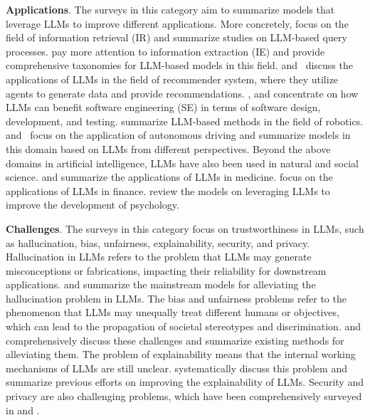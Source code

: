 \documentclass{article}
\theoremstyle{definition}
\theoremstyle{theorem}
\theoremstyle{proof}
\theoremstyle{remark}
\begin{document}
	\textbf{Applications}. The surveys in this category aim to summarize models that leverage LLMs to improve different applications. 
	More concretely, \citet{survey_llm_apply_info1} focus on the field of information retrieval (IR) and summarize studies on LLM-based query processes.
	\citet{survey_llm_apply_info2} pay more attention to information extraction (IE) and provide comprehensive taxonomies for LLM-based models in this field. 
	\citet{survey_llm_apply_recsys, survey_llm_apply_recsys2} and~\citet{survey_llm_apply_recsys3} discuss the applications of LLMs in the field of recommender system, where they utilize agents to generate data and provide recommendations. \citet{survey_llm_apply_software1,survey_llm_apply_software2}, and \citet{survey_llm_apply_software3} concentrate on how LLMs can benefit software engineering (SE) in terms of software design, development, and testing. 
	\citet{survey_llm_apply_robotics} summarize LLM-based methods in the field of robotics.
	\citet{survey_llm_apply_driving1} and~\citet{survey_llm_apply_driving2} focus on the application of autonomous driving and summarize models in this domain based on LLMs from different perspectives.
	Beyond the above domains in artificial intelligence, LLMs have also been used in natural and social science. 
	\citet{survey_llm_apply_med1, survey_llm_apply_med2} and \citet{survey_llm_apply_med3} summarize the applications of LLMs in medicine.
	\citet{survey_llm_apply_finance} focus on the applications of LLMs in finance.
	\citet{survey_llm_apply_psy} review the models on leveraging LLMs to improve the development of psychology. 
	
	\textbf{Challenges}. The surveys in this category focus on trustworthiness in LLMs, such as hallucination, bias, unfairness, explainability, security, and privacy.
	Hallucination in LLMs refers to the problem that LLMs may generate misconceptions or fabrications, impacting their reliability for downstream applications. \citet{survey_llm_hallucination1, survey_llm_hallucination2, survey_llm_hallucination3, survey_llm_hallucination4, survey_llm_hallucination5, survey_llm_hallucination6} and \citet{survey_llm_hallucination7} summarize the mainstream models for alleviating the hallucination problem in LLMs.
	The bias and unfairness problems refer to the phenomenon that LLMs may unequally treat different humans or objectives, which can lead to the propagation of societal stereotypes and discrimination. \citet{survey_llm_bias_fairness1,survey_llm_bias_fairness2} and \citet{survey_llm_bias_fairness3} comprehensively discuss these challenges and summarize existing methods for alleviating them.
	The problem of explainability means that the internal working mechanisms of LLMs are still unclear. \citet{survey_llm_explainability} systematically discuss this problem and summarize previous efforts on improving the explainability of LLMs.
	Security and privacy are also challenging problems, which have been comprehensively surveyed in \citet{survey_llm_security1, survey_llm_security2,survey_llm_security3,survey_llm_security4,survey_llm_security5} and \citet{survey_llm_security6}.
	
\end{document}
